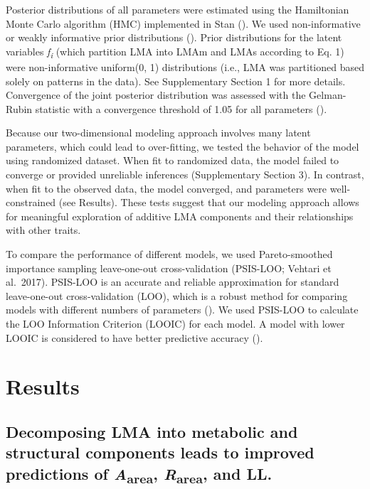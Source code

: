 \documentclass[
  12pt,
  letterpaper,
  DIV=11,
  numbers=noendperiod]{scrartcl}
\begin{document}
Posterior distributions of all parameters were estimated using the
Hamiltonian Monte Carlo algorithm (HMC) implemented in Stan
(). We used
non-informative or weakly informative prior distributions
(). Prior distributions for the
latent variables \emph{f\textsubscript{i}} (which partition LMA into
LMAm and LMAs according to Eq. 1) were non-informative uniform(0, 1)
distributions (i.e., LMA was partitioned based solely on patterns in the
data). See Supplementary Section 1 for more details. Convergence of the
joint posterior distribution was assessed with the Gelman-Rubin
statistic with a convergence threshold of 1.05 for all parameters
().

Because our two-dimensional modeling approach involves many latent
parameters, which could lead to over-fitting, we tested the behavior of
the model using randomized dataset. When fit to randomized data, the
model failed to converge or provided unreliable inferences
(Supplementary Section 3). In contrast, when fit to the observed data,
the model converged, and parameters were well-constrained (see Results).
These tests suggest that our modeling approach allows for meaningful
exploration of additive LMA components and their relationships with
other traits.

To compare the performance of different models, we used Pareto-smoothed
importance sampling leave-one-out cross-validation (PSIS-LOO; Vehtari et
al.~2017). PSIS-LOO is an accurate and reliable approximation for
standard leave-one-out cross-validation (LOO), which is a robust method
for comparing models with different numbers of parameters
(). We used PSIS-LOO to
calculate the LOO Information Criterion (LOOIC) for each model. A model
with lower LOOIC is considered to have better predictive accuracy
().

\section{Results}\label{results}

\subsection{\texorpdfstring{Decomposing LMA into metabolic and
structural components leads to improved predictions of
\emph{A}\textsubscript{area}, \emph{R}\textsubscript{area}, and
LL.}{Decomposing LMA into metabolic and structural components leads to improved predictions of Aarea, Rarea, and LL.}}\label{decomposing-lma-into-metabolic-and-structural-components-leads-to-improved-predictions-of-aarea-rarea-and-ll.}
\end{document}
